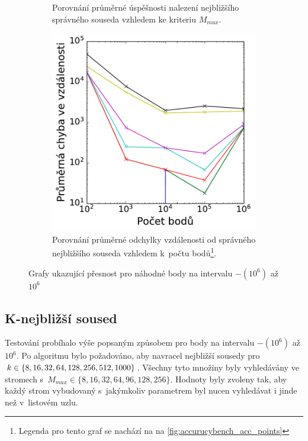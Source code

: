 \begin{figure}
\begin{subfigure}[t]{0.49\columnwidth}
    \caption{Porovnání průměrné úspěšnosti nalezení nejbližšího správného souseda vzhledem ke kriteriu $M_{max}$.}
    \label{fig:accurucybench_err_mmax}


\end{subfigure}
\hfill
\begin{subfigure}[t]{0.49\columnwidth}
    \centering  
    \includegraphics[scale=0.6]{obrazky-figures/benchmark/accuracy/benchmark_avgerr_by_points.pdf}
    \caption{Porovnání průměrné odchylky vzdálenosti od správného nejbližšího souseda vzhledem k~počtu bodů\footnote{Legenda pro tento graf se nachází na na \ref{fig:accurucybench_acc_points}}.}
\label{fig:accurucybench_err_points}

\end{subfigure}



\caption{Grafy ukazující přesnost pro náhodné body na intervalu $-(10^6)$ až $10^6$ }
\label{fig:accurucybench}
\end{figure}



\subsection*{K-nejbližší soused}
Testování probíhalo výše popsaným způsobem pro body na intervalu $-(10^6)$ až $10^6$. Po algoritmu bylo požadováno, aby navracel nejbližší sousedy pro $k \in \{8,16,32,64,128,256,512, \\ 1000\}$. Všechny tyto množiny byly vyhledávány ve stromech s~$M_{max} \in \{8,16,32,64,96,128,256\}$. Hodnoty byly zvoleny tak, aby každý strom vybudovaný s~jakýmkoliv parametrem byl nucen vyhledávat i jinde než v~listovém uzlu.

